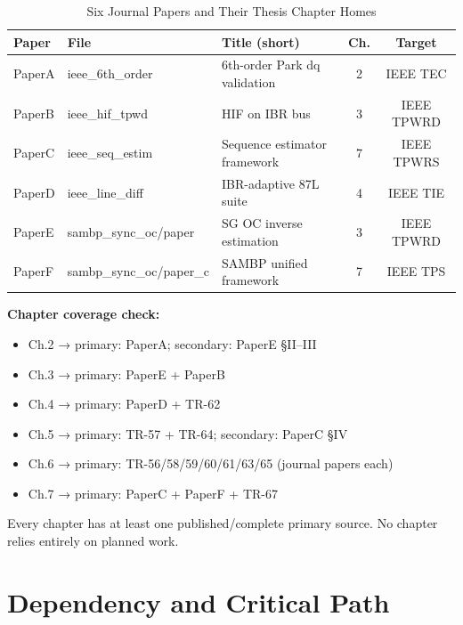 \documentclass[11pt, a4paper]{article}
\begin{document}
\begin{table}[!h]
\centering
\caption{Six Journal Papers and Their Thesis Chapter Homes}
\label{tab:papers}
\begin{tabular}{llp{4.5cm}cc}
\toprule
Paper & File & Title (short) & Ch. & Target \\
\midrule
PaperA & ieee\_6th\_order & 6th-order Park dq validation & 2 & IEEE TEC \\
PaperB & ieee\_hif\_tpwd & HIF on IBR bus & 3 & IEEE TPWRD \\
PaperC & ieee\_seq\_estim & Sequence estimator framework & 7 & IEEE TPWRS \\
PaperD & ieee\_line\_diff & IBR-adaptive 87L suite & 4 & IEEE TIE \\
PaperE & sambp\_sync\_oc/paper & SG OC inverse estimation & 3 & IEEE TPWRD \\
PaperF & sambp\_sync\_oc/paper\_c & SAMBP unified framework & 7 & IEEE TPS \\
\bottomrule
\end{tabular}
\end{table}

\noindent\textbf{Chapter coverage check:}
\begin{itemize}[nosep]
  \item Ch.2 → primary: PaperA; secondary: PaperE §II--III
  \item Ch.3 → primary: PaperE + PaperB
  \item Ch.4 → primary: PaperD + TR-62
  \item Ch.5 → primary: TR-57 + TR-64; secondary: PaperC §IV
  \item Ch.6 → primary: TR-56/58/59/60/61/63/65 (journal papers each)
  \item Ch.7 → primary: PaperC + PaperF + TR-67
\end{itemize}

Every chapter has at least one published/complete primary source.
No chapter relies entirely on planned work.

\section{Dependency and Critical Path}
\label{sec:dependency}
\end{document}
